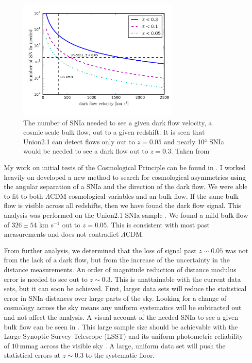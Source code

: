 \documentclass[apj, iop]{emulateapj}
\newcommand{\sn}{SNIa}
\newcommand{\lcdm}{$\Lambda$CDM}     %
\begin{document}
\begin{figure}
	\includegraphics[width=3.2in]{what_dataset_size_v_velocity.pdf} 
    \caption{The number of \sn{} needed to see a given dark flow velocity, a
	cosmic scale bulk flow, out to a given redshift. It is seen that Union2.1 
	can detect flows only out to $z=0.05$ and nearly 10$^4$ \sn{} would be 
	needed to see a dark flow out to $z=0.3$. Taken from \cite{Mathews16}}
	\label{f:sn-needed} 
\end{figure}

My work on initial tests of the Cosmological Principle can be found in
\cite{Mathews16}. I worked heavily on developed a new method to search for
cosmological asymmetries using the angular separation of a \sn{} and the
direction of the dark flow. We were able to fit to both
\lcdm{} cosmological variables and  an bulk flow. If the same bulk flow is
visible across all redshifts, then we have found the dark flow signal. This
analysis was performed on the Union2.1 \sn{} sample \citep{Suzuki12}. We found a
mild bulk flow of $326 \pm 54$ km s$^{-1}$ out to $z = 0.05$. This is consistent
with most past measurements and does not contradict \lcdm{}.

From further analysis, we determined that the loss of signal past $z \sim 0.05$
was not from the lack of a dark flow, but from the increase of the uncertainty
in the distance measurements. An order of magnitude reduction of distance
modulus error is needed to see out to $z \sim 0.3$.  This is unattainable with
the current data sets, but it can soon be achieved. First, larger data sets will
reduce the statistical error in \sn{} distances over large parts of the sky.
Looking for a change of cosmology across the sky means any uniform systematics
will be subtracted out and not affect the analysis.  A visual account of the
needed \sn{} to see a given bulk flow can be seen in  . This
large sample size should be achievable with the Large Synoptic Survey Telescope
(LSST) and its uniform photometric reliability of $10 ~\text{mmag}$ across the
visible sky \citep{Ivezic08}. A large, uniform data set will push the
statistical errors at $z\sim 0.3$ to the systematic floor.
\end{document}
